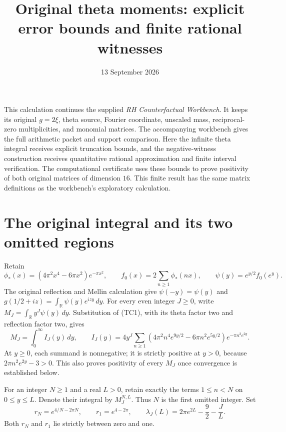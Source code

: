\documentclass[11pt]{article}
\title{Original theta moments: explicit error bounds and finite rational witnesses}
\author{}
\date{13 September 2026}
\newcommand{\R}{\mathbb R}
\begin{document}
\maketitle

This calculation continues the supplied \emph{RH Counterfactual Workbench}.
It keeps its original $g=2\xi$, theta source, Fourier coordinate,
unscaled mass, reciprocal-zero multiplicities, and monomial matrices.
The accompanying workbench gives the full arithmetic packet and support
comparison. Here the infinite theta integral receives explicit truncation
bounds, and the negative-witness construction receives quantitative
rational approximation and finite interval verification.
The computational certificate uses these bounds to prove positivity of
both original matrices of dimension $16$. This finite result has the
same matrix definitions as the workbench's exploratory calculation.

\section{The original integral and its two omitted regions}
Retain
\[
\phi_*(x)=(4\pi^2x^4-6\pi x^2)e^{-\pi x^2},\qquad
f_0(x)=2\sum_{n\ge1}\phi_*(nx),\qquad
\psi(y)=e^{y/2}f_0(e^y).
\tag{TC1}
\]
The original reflection and Mellin calculation give
$\psi(-y)=\psi(y)$ and
$g(1/2+iz)=\int_{\R}\psi(y)e^{izy}\,dy$.
For every even integer $J\ge0$, write $M_J=\int_{\R}y^J\psi(y)\,dy$.
Substitution of (TC1), with its theta factor two and reflection factor
two, gives
\[
M_J=\int_0^\infty I_J(y)\,dy,\qquad
I_J(y)=4y^J\sum_{n\ge1}
\left(4\pi^2n^4e^{9y/2}-6\pi n^2e^{5y/2}\right)
e^{-\pi n^2e^{2y}} .
\tag{TC2}
\]
At $y\ge0$, each summand is nonnegative; it is strictly positive at
$y>0$, because $2\pi n^2e^{2y}-3>0$. This also proves positivity of
every $M_J$ once convergence is established below.

For an integer $N\ge1$ and a real $L>0$, retain exactly the terms
$1\le n<N$ on $0\le y\le L$. Denote their integral by $M_J^{N,L}$.
Thus $N$ is the first omitted integer. Set
\[
r_N=e^{4/N-2\pi N},\qquad r_1=e^{4-2\pi},\qquad
\lambda_J(L)=2\pi e^{2L}-\frac92-\frac{J}{L}.
\tag{TC3}
\]
Both $r_N$ and $r_1$ lie strictly between zero and one.
\end{document}

